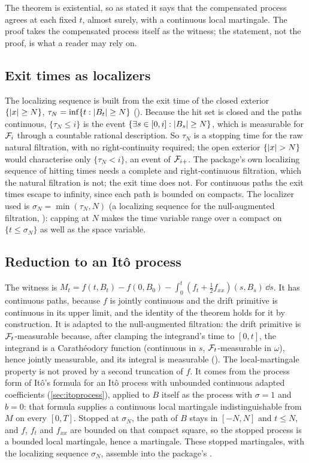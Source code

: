 \documentclass[11pt]{article}
\begin{document}
The theorem is existential, so as stated it says that the compensated process agrees at each fixed $t$, almost
surely, with a continuous local martingale. The proof takes the compensated process itself as the witness; the
statement, not the proof, is what a reader may rely on.

\subsection{Exit times as localizers}
The localizing sequence is built from the exit time of the closed exterior $\{\lvert x\rvert\ge N\}$,
$\tau_N=\inf\{t:\lvert B_t\rvert\ge N\}$ (). Because the hit set is closed and the paths continuous,
$\{\tau_N\le i\}$ is the event $\{\exists s\in[0,i]:\lvert B_s\rvert\ge N\}$, which is measurable for $\mathcal{F}_i$ through a
countable rational description. So $\tau_N$ is a stopping time for the raw natural filtration, with no
right-continuity required; the open exterior $\{\lvert x\rvert>N\}$ would characterise only $\{\tau_N<i\}$, an event of
$\mathcal{F}_{i+}$. The package's own localizing sequence of hitting times needs a complete and right-continuous
filtration, which the natural filtration is not; the exit time does not. For continuous paths the exit times
escape to infinity, since each path is bounded on compacts. The localizer used is $\sigma_N=\min(\tau_N,N)$ (a
localizing sequence for the null-augmented filtration, ): capping at $N$ makes the
time variable range over a compact on $\{t\le\sigma_N\}$ as well as the space variable.

\subsection{Reduction to an It\^o process}
The witness is $M_t=f(t,B_t)-f(0,B_0)-\int_0^t(f_t+\frac12f_{xx})(s,B_s)\,\dd s$. It has continuous paths, because $f$ is
jointly continuous and the drift primitive is continuous in its upper limit, and the identity of the theorem holds
for it by construction. It is adapted to the null-augmented filtration: the drift primitive is $\mathcal{F}_t$-measurable
because, after clamping the integrand's time to $[0,t]$, the integrand is a Carath\'eodory function (continuous in
$s$, $\mathcal{F}_t$-measurable in $\omega$), hence jointly measurable, and its integral is measurable
(). The local-martingale property is not proved by a second truncation
of $f$. It comes from the process form of It\^o's formula for an It\^o process with unbounded continuous adapted
coefficients (\cref{sec:itoprocess}), applied to $B$ itself as the process with $\sigma=1$ and $b=0$: that formula
supplies a continuous local martingale indistinguishable from $M$ on every $[0,T]$. Stopped at $\sigma_N$, the path of
$B$ stays in $[-N,N]$ and $t\le N$, and $f$, $f_t$ and $f_{xx}$ are bounded on that compact square, so the stopped
process is a bounded local martingale, hence a martingale. These stopped martingales, with the localizing sequence
$\sigma_N$, assemble into the package's .
\end{document}

